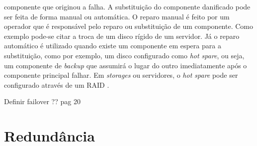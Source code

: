 \begin{itemize}
 componente que originou a falha. A substituição do componente danificado pode ser feita de forma manual ou automática. 
 O reparo manual é feito por um operador que é responsável pelo reparo ou substituição de um componente. Como exemplo pode-se citar
 a troca de um disco rígido de um servidor. Já o reparo automático é utilizado quando existe um componente em espera para a substituição, 
 como por exemplo, um disco configurado como \textit{hot spare}, ou seja, um componente de \textit{backup} que assumirá o lugar do 
 outro imediatamente após o componente principal falhar. Em \textit{storages} ou servidores, o \textit{hot spare} pode ser configurado 
 através de um \ac{RAID} \cite{rouse2013}.
\end{itemize}

Definir failover ??
\cite{bassan2008} pag 20

\section{Redundância}
\label{section:redundancia}

